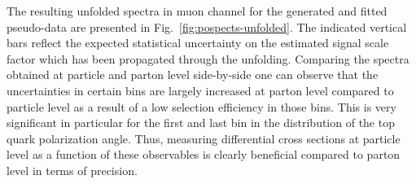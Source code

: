 {\hspace{0.03\textwidth}
}

The resulting unfolded spectra in muon channel for the generated and fitted pseudo-data are presented in Fig.~\ref{fig:pospects-unfolded}. The indicated vertical bars reflect the expected statistical uncertainty on the estimated signal scale factor which has been propagated through the unfolding. Comparing the spectra obtained at particle and parton level side-by-side one can observe that the uncertainties in certain bins are largely increased at parton level compared to particle level as a result of a low selection efficiency in those bins. This is very significant in particular for the first and last bin in the distribution of the top quark polarization angle. Thus, measuring differential cross sections at particle level as a function of these observables is clearly beneficial compared to parton level in terms of precision.

